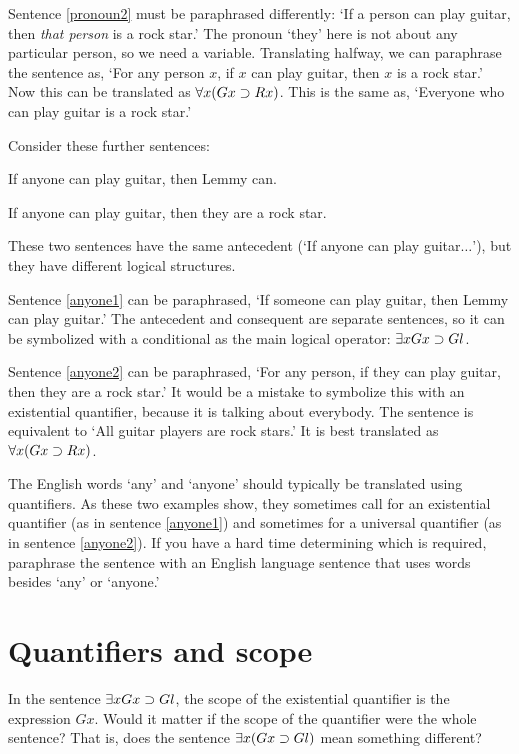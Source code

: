 Sentence \ref{pronoun2} must be paraphrased differently: `If a person can play guitar, then \emph{that person} is a rock star.' The pronoun `they' here is not about any particular person, so we need a variable. Translating halfway, we can paraphrase the sentence as, `For any person $x$, if $x$ can play guitar, then $x$ is a rock star.' Now this can be translated as $\forall x (Gx \supset Rx)$. This is the same as, `Everyone who can play guitar is a rock star.'


Consider these further sentences:

\begin{earg}
\item[\ex{anyone1}] If anyone can play guitar, then Lemmy can.
\item[\ex{anyone2}] If anyone can play guitar, then they are a rock star.
\end{earg}

These two sentences have the same antecedent (`If anyone can play guitar$\ldots$'), but they have different logical structures.

Sentence \ref{anyone1} can be paraphrased, `If someone can play guitar, then Lemmy can play guitar.' The antecedent and consequent are separate sentences, so it can be symbolized with a conditional as the main logical operator: $\exists x Gx \supset Gl$.

Sentence \ref{anyone2} can be paraphrased, `For any person, if they can play guitar, then they are a rock star.' It would be a mistake to symbolize this with an existential quantifier, because it is talking about everybody. The sentence is equivalent to `All guitar players are rock stars.' It is best translated as $\forall x(Gx \supset Rx)$.

The English words `any' and `anyone' should typically be translated using quantifiers. As these two examples show, they sometimes call for an existential quantifier (as in sentence \ref{anyone1}) and sometimes for a universal quantifier (as in sentence \ref{anyone2}). If you have a hard time determining which is required, paraphrase the sentence with an English language sentence that uses words besides `any' or `anyone.'


\section{Quantifiers and scope}

In the sentence $\exists x Gx \supset Gl$, the scope of the existential quantifier is the expression $Gx$. Would it matter if the scope of the quantifier were the whole sentence? That is, does the sentence $\exists x (Gx \supset Gl)$ mean something different?

